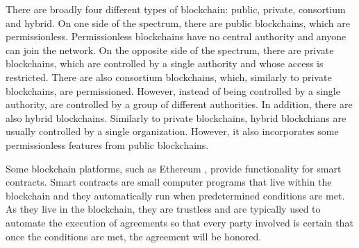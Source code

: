 There are broadly four different types of blockchain: public, private, consortium and hybrid. On one side of the spectrum, there are public blockchains, which are permissionless. Permissionless blockchains have no central authority and anyone can join the network. On the opposite side of the spectrum, there are private blockchains, which are controlled by a single authority and whose access is restricted. There are also consortium blockchains, which, similarly to private blockchains, are permissioned. However, instead of being controlled by a single authority, are controlled by a group of different authorities. In addition, there are also hybrid blockchains. Similarly to private blockchains, hybrid blockchians are usually controlled by a single organization. However, it also incorporates some permissionless features from public blockchains.

Some blockchain platforms, such as Ethereum \cite{wood2014ethereum}, provide functionality for smart contracts. Smart contracts are small computer programs that live within the blockchain and they automatically run when predetermined conditions are met. As they live in the blockchain, they are trustless and are typically used to automate the execution of agreements so that every party involved is certain that once the conditions are met, the agreement will be honored.

